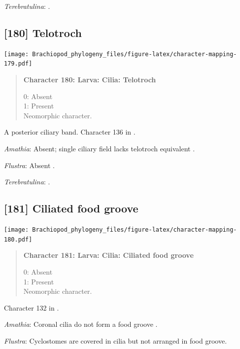 \documentclass[openany]{book}
\begin{document}
\hypertarget{Terebratulina-coding-179}{}
\emph{Terebratulina}: \citet{Williams1997Introduction}.

\subsection*{{[}180{]} Telotroch}\label{telotroch}

\texttt{[image: Brachiopod\_phylogeny\_files/figure-latex/character-mapping-179.pdf]}

\begin{quote}
\textbf{Character 180: Larva: Cilia: Telotroch}

0: Absent\\
1: Present\\
Neomorphic character.
\end{quote}

A posterior ciliary band. Character 136 in \citet{Rouse1999}.

\hypertarget{Amathia-coding-180}{}
\emph{Amathia}: Absent; single ciliary field lacks telotroch equivalent
\citep{Reed1982}.

\hypertarget{Flustra-coding-180}{}
\emph{Flustra}: Absent \citep{Zimmer2013}.

\hypertarget{Terebratulina-coding-180}{}
\emph{Terebratulina}: \citet{Williams1997Introduction}.

\subsection*{{[}181{]} Ciliated food groove}\label{ciliated-food-groove}

\texttt{[image: Brachiopod\_phylogeny\_files/figure-latex/character-mapping-180.pdf]}

\begin{quote}
\textbf{Character 181: Larva: Cilia: Ciliated food groove}

0: Absent\\
1: Present\\
Neomorphic character.
\end{quote}

Character 132 in \citet{Rouse1999}.

\hypertarget{Amathia-coding-181}{}
\emph{Amathia}: Coronal cilia do not form a food groove
\citep{Reed1982}.

\hypertarget{Flustra-coding-181}{}
\emph{Flustra}: Cyclostomes are covered in cilia but not arranged in
food groove.
\end{document}
